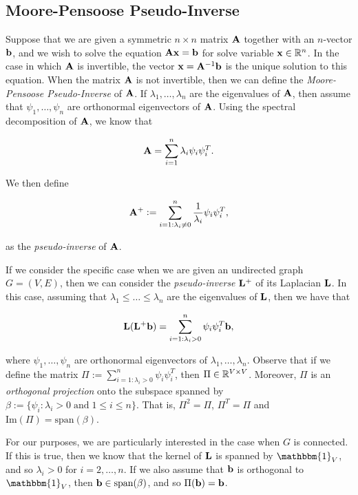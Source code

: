 \documentclass[11pt]{article}
\begin{document}
\subsection{Moore-Pensoose Pseudo-Inverse}

Suppose that we are given a symmetric $n \times n$ matrix $\V{A}$ together with an $n$-vector $\V{b}$,
and we wish to solve the equation $\V{Ax} = \V{b}$ for solve variable $\V{x} \in \rea^{n}$. In the case in which $\V{A}$ is invertible, the vector $\V{x} = \V{A}^{-1}\V{b}$ is the unique solution to this equation.
When the matrix $\V{A}$ is not invertible, then we can define the \textit{Moore-Pensoose Pseudo-Inverse}
of $\V{A}$. If $\lambda_{1}, \ldots ,\lambda_{n}$ are the eigenvalues of $\V{A}$, then assume that
$\psi_{1},\ldots ,\psi_{n}$ are orthonormal eigenvectors of $\V{A}$. Using the spectral decomposition of $\V{A}$, we know that

\[
	\V{A} = \sum_{i=1}^{n} \lambda_{i} \psi_{i} \psi_{i}^{T}.
\]

We then define

\[
	\V{A}^{+}:= \sum_{i=1: \lambda_{i} \neq 0}^{n} \frac{1}{\lambda_{i}} \psi_{i} \psi_{i}^{T},
\]

as the \textit{pseudo-inverse} of $\V{A}$.


If we consider the specific case when we are given an undirected graph $G=(V,E)$,
then we can consider the \textit{pseudo-inverse} $\V{L}^{+}$ of its Laplacian
$\V{L}$. In this case, assuming that $\lambda_{1} \le \ldots \le \lambda_{n}$
are the eigenvalues of $\V{L}$, then we have that

\begin{equation}\label{eqn:pseudo_inverse_solver}
	\V{L}(\V{L}^{+}\V{b})= \sum_{i=1: \lambda_{i} >0}^{n} \psi_{i} \psi_{i}^{T} \V{b},
\end{equation}

where $\psi_{1},\ldots ,\psi_{n}$ are orthonormal eigenvectors of $\lambda_{1}, \ldots ,\lambda_{n}$.
Observe that if we define the matrix $\Pi:=\sum_{i=1: \lambda_{i} >0}^{n} \psi_{i} \psi_{i}^{T}$,
then $\Pi \in \mathbb R^{V \times V}$. Moreover, $\Pi$ is an \textit{orthogonal projection} onto the subspace
spanned by $\beta:=\{\psi_{i}: \lambda_{i} >0 \; \text{and} \; 1\le i \le n\}$. That is, $\Pi^{2}=\Pi$,
$\Pi^{T}=\Pi$ and $\text{Im}(\Pi)= \text{span}(\beta)$.


For our purposes, we are particularly interested in the case when $G$ is connected.
If this is true, then we know that the kernel of $\V{L}$ is spanned by $\mathbbm{1}_{V}$, and so
$\lambda_{i} > 0$ for $i=2, \ldots ,n$. If we also assume that $\V{b}$ is orthogonal to $\mathbbm{1}_{V}$,
then $\V{b}\in \text{span}(\beta)$, and so $\Pi(\V{b})=\V{b}$.
\end{document}
